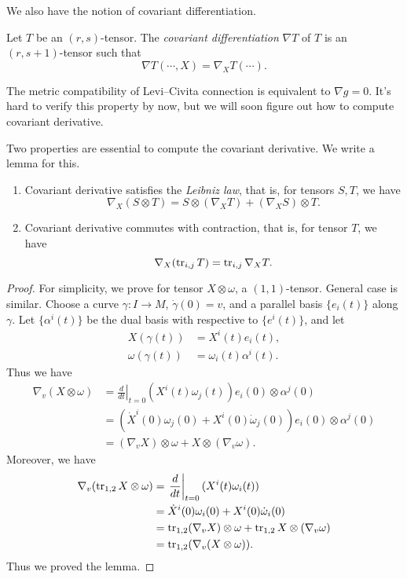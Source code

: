 We also have the notion of covariant differentiation.
\begin{defn}
    Let $T$ be an $(r,s)$-tensor.
    The \emph{covariant differentiation} $\nabla T$ of $T$ is an $(r,s+1)$-tensor such that
    \[\nabla T(\cdots,X)=\nabla_XT(\cdots).\]
\end{defn}

\begin{eg}
    The metric compatibility of Levi--Civita connection is equivalent to $\nabla g=0$.
    It's hard to verify this property by now, but we will soon figure out how to compute covariant derivative.
\end{eg}

Two properties are essential to compute the covariant derivative.
We write a lemma for this.

\begin{lem}
    \begin{enumerate}[\rm(1)]
        \item Covariant derivative satisfies the \emph{Leibniz law}, that is, for tensors $S,T$, we have
        \[\nabla_X(S\otimes T)=S\otimes(\nabla_XT)+(\nabla_XS)\otimes T.\]
        \item Covariant derivative commutes with contraction, that is, for tensor $T$, we have
        \[\nabla_X(\operatorname{tr}_{i,j}T)=\operatorname{tr}_{i,j}\nabla_XT.\]
    \end{enumerate}
\end{lem}
\begin{proof}
    For simplicity, we prove for tensor $X\otimes\omega$, a $(1,1)$-tensor.
    General case is similar.
    Choose a curve $\gamma:I\to M$, $\dot\gamma(0)=v$, and a parallel basis $\{e_i(t)\}$ along $\gamma$.
    Let $\{\alpha^i(t)\}$ be the dual basis with respective to $\{e^i(t)\}$, and let
    \begin{align*}
        X(\gamma(t))&=X^i(t)e_i(t),\\
        \omega(\gamma(t))&=\omega_i(t)\alpha^i(t).
    \end{align*}
    Thus we have
    \begin{align*}
        \nabla_v(X\otimes\omega)&=\left.\frac{d}{dt}\right|_{t=0}(X^i(t)\omega_j(t))e_i(0)\otimes\alpha^j(0)\\
        &=\left(\dot{X}^i(0)\omega_j(0)+X^i(0)\dot\omega_j(0)\right)e_i(0)\otimes\alpha^j(0)\\
        &=(\nabla_vX)\otimes\omega+X\otimes(\nabla_v\omega).
    \end{align*}
    Moreover, we have
    \begin{align*}
        \nabla_v(\operatorname{tr}_{1,2}X\otimes\omega)&=\left.\frac{d}{dt}\right|_{t=0}(X^i(t)\omega_i(t))\\
        &=\dot{X}^i(0)\omega_i(0)+X^i(0)\dot\omega_i(0)\\
        &=\operatorname{tr}_{1,2}(\nabla_vX)\otimes\omega+\operatorname{tr}_{1,2}X\otimes(\nabla_v\omega)\\
        &=\operatorname{tr}_{1,2}(\nabla_v(X\otimes\omega)).
    \end{align*}
    Thus we proved the lemma.
\end{proof}

